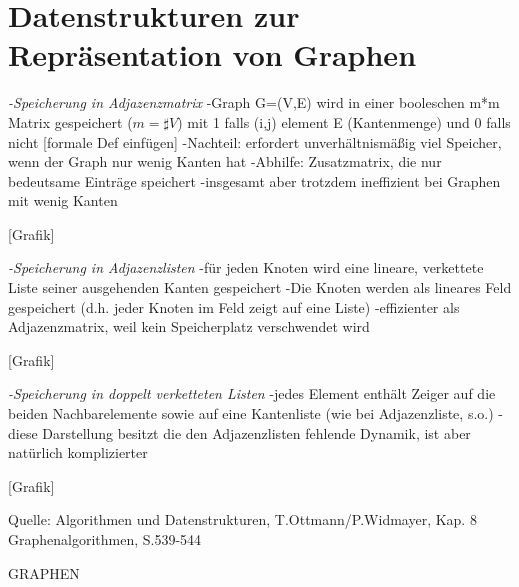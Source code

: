 \section{Datenstrukturen zur Repräsentation von Graphen}

\emph{-Speicherung in Adjazenzmatrix}
-Graph G=(V,E) wird in einer booleschen m*m Matrix gespeichert ($m = \sharp V$)
 mit 1 falls (i,j) element E (Kantenmenge) und 0 falls nicht
 [formale Def einfügen]
 -Nachteil: erfordert unverhältnismäßig viel Speicher, wenn der Graph nur wenig    	  Kanten hat
 -Abhilfe: Zusatzmatrix, die nur bedeutsame Einträge speichert
 -insgesamt aber trotzdem ineffizient bei Graphen mit wenig Kanten
 
 [Grafik]
 
\emph{-Speicherung in Adjazenzlisten}
-für jeden Knoten wird eine lineare, verkettete Liste seiner ausgehenden Kanten gespeichert
-Die Knoten werden als lineares Feld gespeichert (d.h. jeder Knoten im Feld zeigt auf eine Liste)
-effizienter als Adjazenzmatrix, weil kein Speicherplatz verschwendet wird

[Grafik]

\emph{-Speicherung in doppelt verketteten Listen}
-jedes Element enthält Zeiger auf die beiden Nachbarelemente sowie auf eine Kantenliste (wie bei Adjazenzliste, s.o.)
-diese Darstellung besitzt die den Adjazenzlisten fehlende Dynamik, ist aber natürlich komplizierter

[Grafik]

Quelle:
Algorithmen und Datenstrukturen, T.Ottmann/P.Widmayer, Kap. 8 Graphenalgorithmen, S.539-544

GRAPHEN